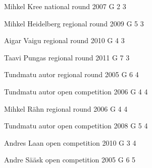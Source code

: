 \documentclass[11pt]{article}
\begin{document}
\ylDisplay{} %
{Mihkel Kree} %
{national round} %
{2007} %
{G 2} %
{3} %
{

\ifEngSolution
\fi
}

\ylDisplay{} %
{Mihkel Heidelberg} %
{regional round} %
{2009} %
{G 5} %
{3} %
{

\ifEngSolution
\fi
}

\ylDisplay{} %
{Aigar Vaigu} %
{regional round} %
{2010} %
{G 4} %
{3} %
{

\ifEngSolution
\fi
}

\ylDisplay{} %
{Taavi Pungas} %
{regional round} %
{2011} %
{G 7} %
{3} %
{

\ifEngSolution
\fi
}

\ylDisplay{} %
{Tundmatu autor} %
{regional round} %
{2005} %
{G 6} %
{4} %
{

\ifEngSolution
\fi
}

\ylDisplay{} %
{Tundmatu autor} %
{open competition} %
{2006} %
{G 4} %
{4} %
{

\ifEngSolution
\fi
}

\ylDisplay{} %
{Mihkel Rähn} %
{regional round} %
{2006} %
{G 4} %
{4} %
{

\ifEngSolution
\fi
}

\ylDisplay{} %
{Tundmatu autor} %
{open competition} %
{2008} %
{G 5} %
{4} %
{

\ifEngSolution
\fi
}

\ylDisplay{} %
{Andres Laan} %
{open competition} %
{2010} %
{G 3} %
{4} %
{

\ifEngSolution
\fi
}

\ylDisplay{} %
{Andre Sääsk} %
{open competition} %
{2005} %
{G 6} %
{5} %
{

\ifEngSolution
\fi
}
\end{document}
